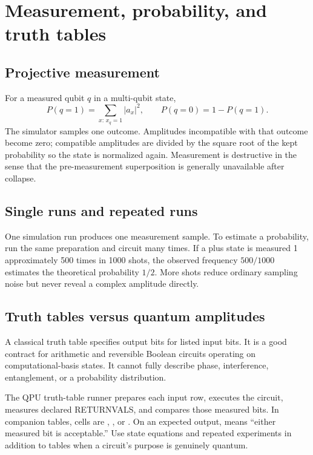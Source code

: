 \section{Measurement, probability, and truth tables}

\subsection{Projective measurement}

For a measured qubit $q$ in a multi-qubit state,
\[
P(q=1)=\sum_{x:\,x_q=1}|a_x|^2,\qquad
P(q=0)=1-P(q=1).
\]
The simulator samples one outcome. Amplitudes incompatible with that outcome
become zero; compatible amplitudes are divided by the square root of the kept
probability so the state is normalized again. Measurement is destructive in
the sense that the pre-measurement superposition is generally unavailable
after collapse.

\subsection{Single runs and repeated runs}

One simulation run produces one measurement sample. To estimate a probability,
run the same preparation and circuit many times. If a plus state is measured
1 approximately 500 times in 1000 shots, the observed frequency $500/1000$
estimates the theoretical probability $1/2$. More shots reduce ordinary
sampling noise but never reveal a complex amplitude directly.

\subsection{Truth tables versus quantum amplitudes}

A classical truth table specifies output bits for listed input bits. It is a
good contract for arithmetic and reversible Boolean circuits operating on
computational-basis states. It cannot fully describe phase, interference,
entanglement, or a probability distribution.

The QPU truth-table runner prepares each input row, executes the circuit,
measures declared RETURNVALS, and compares those measured bits. In companion
 tables, cells are , , or . On an
expected output,  means ``either measured bit is acceptable.'' Use
state equations and repeated experiments in addition to tables when a circuit's
purpose is genuinely quantum.

